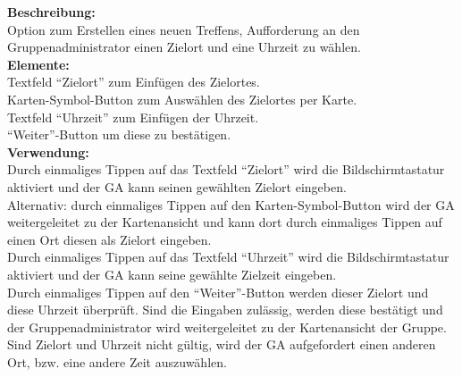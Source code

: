 \textbf{Beschreibung:}\\
Option zum Erstellen eines neuen Treffens, Aufforderung an den Gruppenadministrator einen Zielort und eine Uhrzeit zu wählen.\\
\textbf{Elemente:}\\
Textfeld "`Zielort"' zum Einfügen des Zielortes.\\
Karten-Symbol-Button zum Auswählen des Zielortes per Karte.\\
Textfeld "`Uhrzeit"' zum Einfügen der Uhrzeit.\\
"`Weiter"'-Button um diese zu bestätigen.\\
\textbf{Verwendung:}\\
Durch einmaliges Tippen auf das Textfeld "`Zielort"' wird die Bildschirmtastatur aktiviert und der GA kann seinen gewählten Zielort eingeben.\\
Alternativ: durch einmaliges Tippen auf den Karten-Symbol-Button wird der GA weitergeleitet zu der Kartenansicht und kann dort durch einmaliges Tippen auf einen Ort diesen als Zielort eingeben.\\
Durch einmaliges Tippen auf das Textfeld "`Uhrzeit"' wird die Bildschirmtastatur aktiviert und der GA kann seine gewählte Zielzeit eingeben.\\
Durch einmaliges Tippen auf den "`Weiter"'-Button werden dieser Zielort und diese Uhrzeit überprüft. Sind die Eingaben zulässig, werden diese bestätigt und der Gruppenadministrator wird weitergeleitet zu der Kartenansicht der Gruppe. Sind Zielort und Uhrzeit nicht gültig, wird der GA aufgefordert einen anderen Ort, bzw. eine andere Zeit auszuwählen.
\clearpage
\newpage



